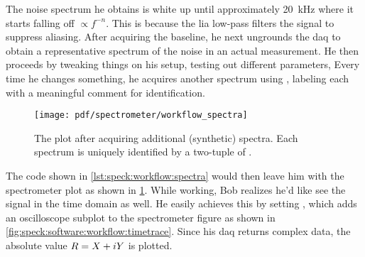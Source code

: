 The noise spectrum he obtains is white up until approximately \qty{20}{\kilo\hertz} where it starts falling off $\propto f^{-n}$.
This is because the \gls{lia} low-pass filters the signal to suppress aliasing.
After acquiring the baseline, he next ungrounds the \gls{daq} to obtain a representative spectrum of the noise in an actual measurement.
He then proceeds by tweaking things on his setup, testing out different parameters, \etc
Every time he changes something, he acquires another spectrum using , labeling each with a meaningful comment for identification.
\begin{figure}
    \centering
    \texttt{[image: pdf/spectrometer/workflow\_spectra]}
    \caption{
        The \pyspeck plot after acquiring additional (synthetic) spectra.
        Each spectrum is uniquely identified by a two-tuple of .
    }
    \label{fig:speck:software:workflow:spectra}
\end{figure}
The code shown in \cref{lst:speck:workflow:spectra} would then leave him with the spectrometer plot as shown in \cref{fig:speck:software:workflow:spectra}.
While working, Bob realizes he'd like see the signal in the time domain as well.
He easily achieves this by setting , which adds an oscilloscope subplot to the spectrometer figure as shown in \cref{fig:speck:software:workflow:timetrace}.
Since his \gls{daq} returns complex data, the absolute value $R = X + i Y$ is plotted.

